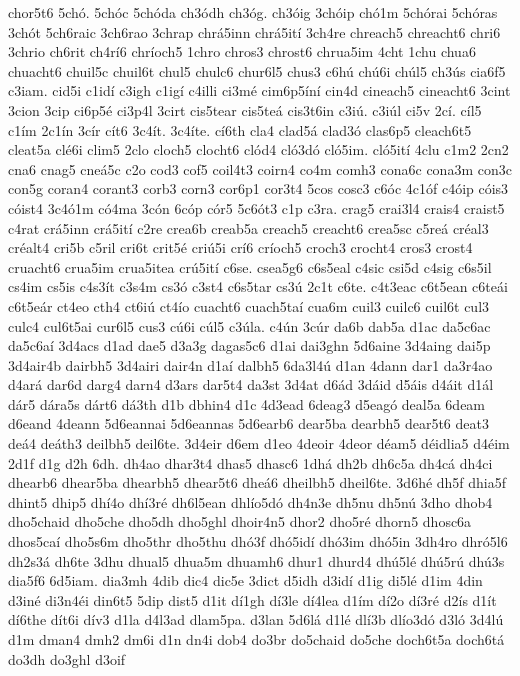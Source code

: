 {chor5t6
5chó.
5chóc
5chóda
ch3ódh
ch3óg.
ch3óig
3chóip
chó1m
5chórai
5chóras
3chót
5ch6raic
3ch6rao
3chrap
chrá5inn
chrá5ití
3ch4re
chreach5
chreacht6
chri6
3chrio
ch6rit
ch4rí6
chríoch5
1chro
chros3
chrost6
chrua5im
4cht
1chu
chua6
chuacht6
chuil5c
chuil6t
chul5
chulc6
chur6l5
chus3
c6hú
chú6i
chúl5
ch3ús
cia6f5
c3iam.
cid5i
c1idí
c3igh
c1igí
c4illi
ci3mé
cim6p5íní
cin4d
cineach5
cineacht6
3cint
3cion
3cip
ci6p5é
ci3p4l
3cirt
cis5tear
cis5teá
cis3t6in
c3iú.
c3iúl
ci5v
2cí.
cíl5
c1ím
2c1ín
3cír
cít6
3c4ít.
3c4íte.
cí6th
cla4
clad5á
clad3ó
clas6p5
cleach6t5
cleat5a
clé6i
clim5
2clo
cloch5
clocht6
clód4
cló3dó
cló5im.
cló5ití
4clu
c1m2
2cn2
cna6
cnag5
cneá5c
c2o
cod3
cof5
coil4t3
coirn4
co4m
comh3
cona6c
cona3m
con3c
con5g
coran4
corant3
corb3
corn3
cor6p1
cor3t4
5cos
cosc3
c6óc
4c1óf
c4óip
cóis3
cóist4
3c4ó1m
có4ma
3cón
6cóp
cór5
5c6ót3
c1p
c3ra.
crag5
crai3l4
crais4
craist5
c4rat
crá5inn
crá5ití
c2re
crea6b
creab5a
creach5
creacht6
crea5sc
c5reá
créal3
créalt4
cri5b
c5ril
cri6t
crit5é
criú5i
crí6
críoch5
croch3
crocht4
cros3
crost4
cruacht6
crua5im
crua5itea
crú5ití
c6se.
csea5g6
c6s5eal
c4sic
csi5d
c4sig
c6s5il
cs4im
cs5is
c4s3ít
c3s4m
cs3ó
c3st4
c6s5tar
cs3ú
2c1t
c6te.
c4t3eac
c6t5ean
c6teái
c6t5eár
ct4eo
cth4
ct6iú
ct4ío
cuacht6
cuach5taí
cua6m
cuil3
cuilc6
cuil6t
cul3
culc4
cul6t5ai
cur6l5
cus3
cú6i
cúl5
c3úla.
c4ún
3cúr
da6b
dab5a
d1ac
da5c6ac
da5c6aí
3d4acs
d1ad
dae5
d3a3g
dagas5c6
d1ai
dai3ghn
5d6aine
3d4aing
dai5p
3d4air4b
dairbh5
3d4airi
dair4n
d1aí
dalbh5
6da3l4ú
d1an
4dann
dar1
da3r4ao
d4ará
dar6d
darg4
darn4
d3ars
dar5t4
da3st
3d4at
d6ád
3dáid
d5áis
d4áit
d1ál
dár5
dára5s
dárt6
dá3th
d1b
dbhin4
d1c
4d3ead
6deag3
d5eagó
deal5a
6deam
d6eand
4deann
5d6eannai
5d6eannas
5d6earb6
dear5ba
dearbh5
dear5t6
deat3
deá4
deáth3
deilbh5
deil6te.
3d4eir
d6em
d1eo
4deoir
4deor
déam5
déidlia5
d4éim
2d1f
d1g
d2h
6dh.
dh4ao
dhar3t4
dhas5
dhasc6
1dhá
dh2b
dh6c5a
dh4cá
dh4ci
dhearb6
dhear5ba
dhearbh5
dhear5t6
dheá6
dheilbh5
dheil6te.
3d6hé
dh5f
dhia5f
dhint5
dhip5
dhí4o
dhí3ré
dh6l5ean
dhlío5dó
dh4n3e
dh5nu
dh5nú
3dho
dhob4
dho5chaid
dho5che
dho5dh
dho5ghl
dhoir4n5
dhor2
dho5ré
dhorn5
dhosc6a
dhos5caí
dho5s6m
dho5thr
dho5thu
dhó3f
dhó5idí
dhó3im
dhó5in
3dh4ro
dhró5l6
dh2s3á
dh6te
3dhu
dhual5
dhua5m
dhuamh6
dhur1
dhurd4
dhú5lé
dhú5rú
dhú3s
dia5f6
6d5iam.
dia3mh
4dib
dic4
dic5e
3dict
d5idh
d3idí
d1ig
di5lé
d1im
4din
d3iné
di3n4éi
din6t5
5dip
dist5
d1it
dí1gh
dí3le
dí4lea
d1ím
dí2o
dí3ré
d2ís
d1ít
dí6the
dít6i
dív3
d1la
d4l3ad
dlam5pa.
d3lan
5d6lá
d1lé
dlí3b
dlío3dó
d3ló
3d4lú
d1m
dman4
dmh2
dm6i
d1n
dn4i
dob4
do3br
do5chaid
do5che
doch6t5a
doch6tá
do3dh
do3ghl
d3oif
}
